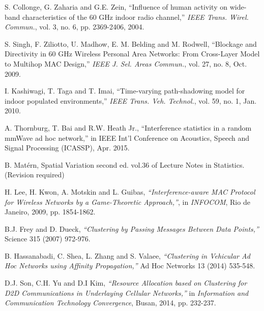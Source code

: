 \documentclass[10pt, conference, letterpaper]{IEEEtran}
\begin{document}
\begin{thebibliography}{50}
S. Collonge, G. Zaharia and G.E. Zein, ``Influence of human activity on wide-band characteristics of the 60 GHz indoor radio channel,'' \emph{IEEE Trans. Wirel. Commun.}, vol. 3,  no. 6, pp. 2369-2406, 2004.

S. Singh, F. Ziliotto, U. Madhow, E. M. Belding and M. Rodwell, ``Blockage and Directivity in 60 GHz Wireless Personal Area Networks: From Cross-Layer Model to Multihop MAC Design,'' \emph{IEEE J. Sel. Areas Commun.}, vol. 27, no. 8, Oct. 2009.

I. Kashiwagi, T. Taga and T. Imai, ``Time-varying path-shadowing model for indoor populated environments,'' \emph{IEEE Trans. Veh. Technol.}, vol. 59, no. 1, Jan. 2010. 

A. Thornburg, T. Bai and R.W. Heath Jr., ``Interference statistics in a random mmWave ad hoc network,'' in IEEE Int'l Conference on Acoustics, Speech and Signal Processing (ICASSP), Apr. 2015.

B. Mat\'ern, Spatial Variation second ed. vol.36 of Lecture Notes in Statistics. (Revision required)

H. Lee, H. Kwon, A. Motskin and  L. Guibas, \emph{``Interference-aware MAC Protocol for Wireless Networks by a Game-Theoretic Approach,''}, in \emph{INFOCOM}, Rio de Janeiro, 2009, pp. 1854-1862.

B.J. Frey and D. Dueck, \emph{``Clustering by Passing Messages Between Data Points,''} Science 315 (2007) 972-976.

B. Hassanabadi, C. Shea, L. Zhang and S. Valaee, \emph{``Clustering in Vehicular Ad Hoc Networks using Affinity Propagation,''} Ad Hoc Networks 13 (2014) 535-548.

D.J. Son, C.H. Yu and D.I Kim, \emph{``Resource Allocation based on Clustering for D2D Communications in Underlaying Cellular Networks,''} in \emph{Information and Communication Technology Convergence}, Busan, 2014, pp. 232-237.

\end{thebibliography}
\end{document}
